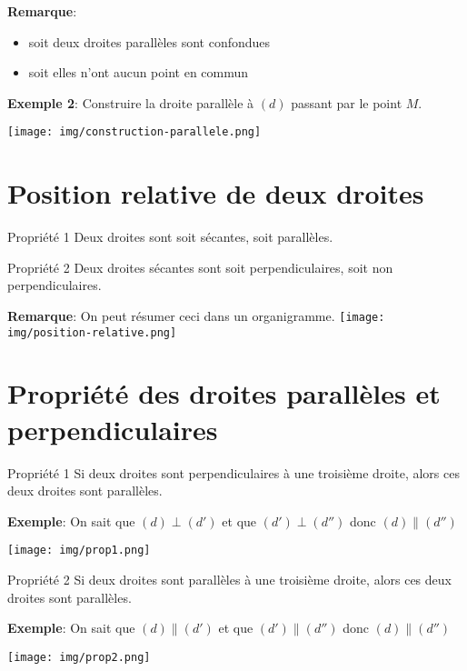 \documentclass[12pt,a4paper]{article}
\begin{document}
\textbf{Remarque}:
\begin{itemize}
\item soit deux droites parallèles sont confondues
\item soit elles n'ont aucun point en commun
\end{itemize}

\textbf{Exemple 2}: Construire la droite parallèle à $(d)$ passant par le point $M$.

\texttt{[image: img/construction-parallele.png]} 

\section{Position relative de deux droites}

\begin{minipage}{0.35\textwidth}
\begin{definition}{Propriété 1}
Deux droites sont soit sécantes, soit parallèles.
\end{definition}
\begin{definition}{Propriété 2}
Deux droites sécantes sont soit perpendiculaires, soit non perpendiculaires.
\end{definition}
\end{minipage}
\begin{minipage}{0.7\textwidth}
\textbf{Remarque}: On peut résumer ceci dans un organigramme.
\texttt{[image: img/position-relative.png]} 
\end{minipage}

\section{Propriété des droites parallèles et perpendiculaires}

\begin{definition}{Propriété 1}
Si deux droites sont perpendiculaires à une troisième droite, alors ces deux droites sont parallèles.
\end{definition}
\begin{minipage}{0.7\textwidth}
\textbf{Exemple}: On sait que $(d)\perp(d')$ et que $(d')\perp(d'')$ donc $(d)\parallel (d'')$
\end{minipage}
\begin{minipage}{0.3\textwidth}
\texttt{[image: img/prop1.png]} 
\end{minipage}

\begin{definition}{Propriété 2}
Si deux droites sont parallèles à une troisième droite, alors ces deux droites sont parallèles.
\end{definition}
\begin{minipage}{0.7\textwidth}
\textbf{Exemple}: On sait que $(d)\parallel(d')$ et que $(d')\parallel(d'')$ donc $(d)\parallel (d'')$
\end{minipage}
\begin{minipage}{0.3\textwidth}
\texttt{[image: img/prop2.png]} 
\end{minipage}
\end{document}
